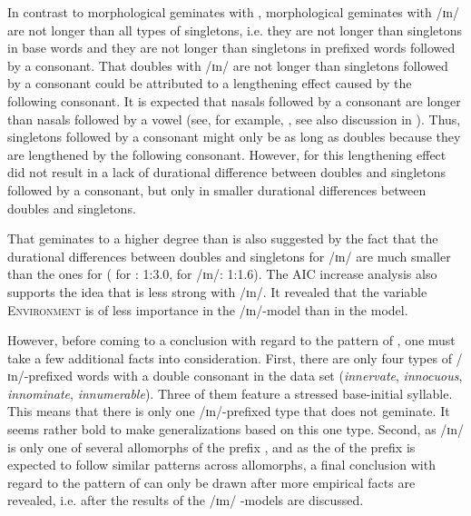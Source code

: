 In contrast to morphological geminates with , 
morphological geminates with /ɪn/ are not longer than all types of singletons, i.e. they are not longer than singletons in base words and they are not longer than singletons in prefixed words followed by a consonant. 
That doubles with /ɪn/ are not longer than singletons followed by a consonant could be attributed to a lengthening effect caused by the following consonant.
It is expected that nasals followed by a consonant are longer than nasals followed by a vowel (see, for example, \citealt{Umeda.1977}, see also discussion in ).  Thus, singletons followed by a consonant might only be as long as doubles because they are lengthened by the following consonant. However, for  this lengthening effect did not result in a lack of durational difference between doubles and singletons followed by a consonant, but only in smaller durational differences between doubles and singletons.  

That  geminates to a higher degree than  is also suggested by the fact that the durational differences between doubles and singletons for /ɪn/ are much smaller than the ones for  ( for : 1:3.0,  for /ɪn/: 1:1.6). 
The AIC increase analysis also supports the idea that  is less strong with /ɪn/. It revealed that the variable \textsc{Environment} is of less importance in the /ɪn/-model than in the model.




However, before coming to a conclusion with regard to the  pattern of , one must take a few additional facts into consideration. 
First, there are only four types of /ɪn/-prefixed words with a double consonant in the data set (\textit{innervate}, \textit{innocuous}, \textit{innominate}, \textit{innumerable}). Three of them feature a stressed base-initial syllable. This means that there is only one /ɪn/-prefixed type that does not geminate. It seems rather bold to make generalizations based on this one type. 
Second, as /ɪn/ is only one of several allomorphs of the prefix , and as the  of the prefix  is expected to follow similar patterns across allomorphs, 
a final conclusion with regard to the  pattern of  can only be drawn after more empirical facts are revealed, i.e. after the results of the /ɪm/ -models are discussed.
%


